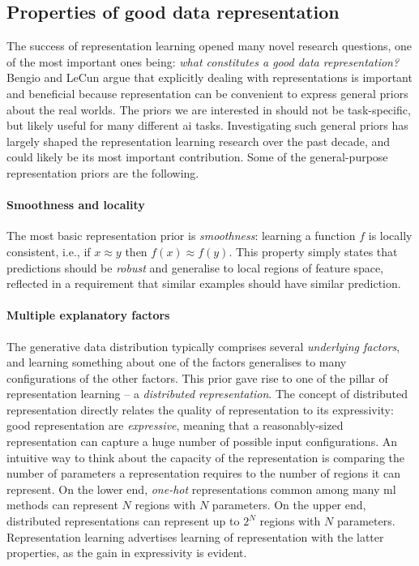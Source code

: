 \subsection{Properties of good data representation}
\label{ch3:sec:properties}


The success of representation learning opened many novel research questions, one of the most important ones being: \textit{what constitutes a good data representation?}
Bengio and LeCun \cite{Bengio2013RLR} argue that explicitly dealing with representations is important and beneficial because representation can be convenient to express general priors about the real worlds.
The priors we are interested in should not be task-specific, but likely useful for many different \gls{ai} tasks.
Investigating such general priors has largely shaped the representation learning research over the past decade, and could likely be its most important contribution.
Some of the general-purpose representation priors are the following.



\paragraph{\textbf{Smoothness and locality}}
The most basic representation prior is \textit{smoothness}: learning a function $f$ is locally consistent, i.e., if $ x \approx y$ then $f(x) \approx f(y)$.
This property simply states that predictions should be \textit{robust} and generalise to local regions of feature space, reflected in a requirement that similar examples should have similar prediction.




\paragraph{\textbf{Multiple explanatory factors}}
The generative data distribution typically comprises several \textit{underlying factors}, and learning something about one of the factors generalises to many configurations of the other factors.
This prior gave rise to one of the pillar of representation learning -- a  \textit{distributed representation}.
The concept of distributed representation directly relates the quality of representation to its expressivity: good representation are \textit{expressive}, meaning that a reasonably-sized representation can capture a huge number of possible input configurations.
An intuitive way to think about the capacity of the representation is comparing the number of parameters a representation requires to the number of regions it can represent.
On the lower end, \textit{one-hot} representations common among many \gls{ml} methods can represent $N$ regions with $N$ parameters.
On the upper end, distributed representations can represent up to $2^N$ regions with $N$ parameters.
Representation learning advertises learning of representation with the latter properties, as the gain in expressivity is evident.



